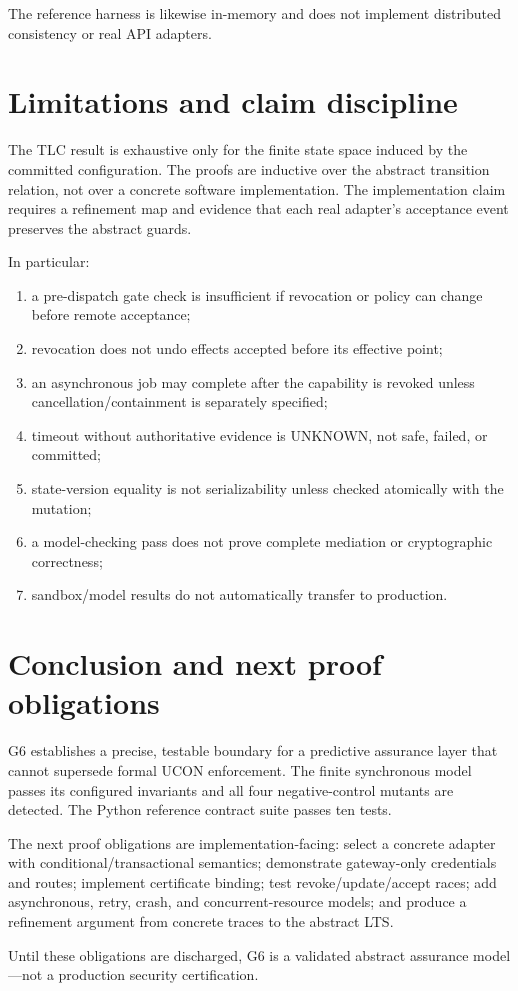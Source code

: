 \documentclass[11pt,a4paper]{article}
\theoremstyle{remark}
\begin{document}
The reference harness is likewise in-memory and does not implement distributed consistency or real API adapters.

\section{Limitations and claim discipline}

The TLC result is exhaustive only for the finite state space induced by the committed configuration. The proofs are inductive over the abstract transition relation, not over a concrete software implementation. The implementation claim requires a refinement map and evidence that each real adapter's acceptance event preserves the abstract guards.

In particular:
\begin{enumerate}[leftmargin=2em]
\item a pre-dispatch gate check is insufficient if revocation or policy can change before remote acceptance;
\item revocation does not undo effects accepted before its effective point;
\item an asynchronous job may complete after the capability is revoked unless cancellation/containment is separately specified;
\item timeout without authoritative evidence is UNKNOWN, not safe, failed, or committed;
\item state-version equality is not serializability unless checked atomically with the mutation;
\item a model-checking pass does not prove complete mediation or cryptographic correctness;
\item sandbox/model results do not automatically transfer to production.
\end{enumerate}

\section{Conclusion and next proof obligations}

G6 establishes a precise, testable boundary for a predictive assurance layer that cannot supersede formal UCON enforcement. The finite synchronous model passes its configured invariants and all four negative-control mutants are detected. The Python reference contract suite passes ten tests.

The next proof obligations are implementation-facing: select a concrete adapter with conditional/transactional semantics; demonstrate gateway-only credentials and routes; implement certificate binding; test revoke/update/accept races; add asynchronous, retry, crash, and concurrent-resource models; and produce a refinement argument from concrete traces to the abstract LTS.

Until these obligations are discharged, G6 is a validated abstract assurance model—not a production security certification.
\end{document}
